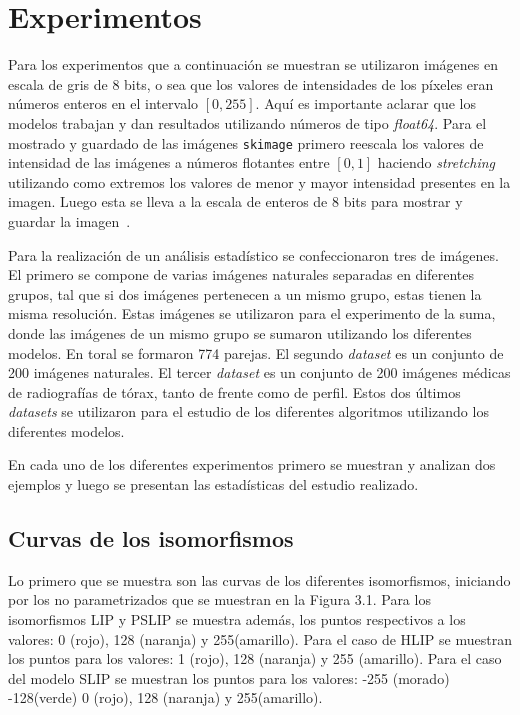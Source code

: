 \section{Experimentos}
Para los experimentos que a continuaci\'on se muestran se utilizaron im\'agenes en escala de gris de 8 bits, o sea que los valores de intensidades de los p\'ixeles eran n\'umeros enteros en el intervalo $[0,255]$. Aqu\'i es importante aclarar que los modelos trabajan y dan resultados utilizando n\'umeros de tipo \textit{float64}. Para el mostrado y guardado de las im\'agenes \verb|skimage| primero reescala los valores de intensidad de las im\'agenes a n\'umeros flotantes entre $[0,1]$ haciendo \textit{stretching} utilizando como extremos los valores de menor y mayor intensidad presentes en la imagen. Luego esta se lleva a la escala de enteros de 8 bits para mostrar y guardar la imagen~\cite{image_data_types_and_what_they_mean}.

Para la realizaci\'on de un an\'alisis estad\'istico se confeccionaron tres  de im\'agenes. El primero se compone de varias im\'agenes naturales separadas en diferentes grupos, tal que si dos im\'agenes pertenecen a un mismo grupo, estas tienen la misma resoluci\'on. Estas im\'agenes se utilizaron para el experimento de la suma, donde las im\'agenes de un mismo grupo se sumaron utilizando los diferentes modelos. En toral se formaron 774 parejas. El segundo \textit{dataset} es un conjunto de 200 im\'agenes naturales. El tercer \textit{dataset} es un conjunto de 200 im\'agenes m\'edicas de radiograf\'ias de t\'orax, tanto de frente como de perfil. Estos dos \'ultimos \textit{datasets} se utilizaron para el estudio de los diferentes algoritmos utilizando los diferentes modelos.

En cada uno de los diferentes experimentos primero se muestran y analizan dos ejemplos y luego se presentan las estad\'isticas del estudio realizado.

\subsection{Curvas de los isomorfismos}
Lo primero que se muestra son las curvas de los diferentes isomorfismos, iniciando por los no parametrizados que se muestran en la Figura 3.1. Para los isomorfismos LIP y PSLIP se muestra adem\'as, los puntos respectivos a los valores: 0 (rojo), 128 (naranja) y 255(amarillo). Para el caso de HLIP se muestran los puntos para los valores: 1 (rojo), 128 (naranja) y 255 (amarillo). Para el caso del modelo SLIP se muestran los puntos para los valores: -255 (morado) -128(verde) 0 (rojo), 128 (naranja) y 255(amarillo).

